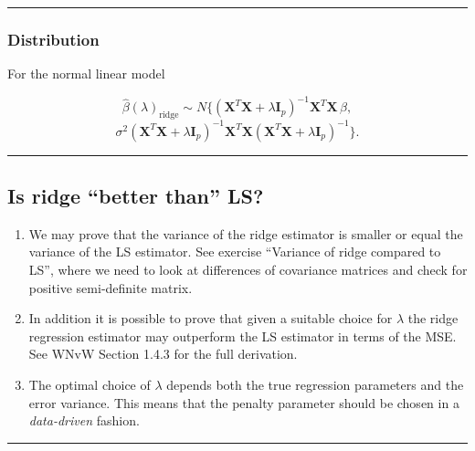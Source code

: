 \documentclass[
  letterpaper,
  DIV=11,
  numbers=noendperiod]{scrartcl}
\begin{document}
\begin{center}\rule{0.5\linewidth}{0.5pt}\end{center}

\hypertarget{distribution}{%
\subsubsection{Distribution}\label{distribution}}

For the normal linear model

\[\hat{\beta}(\lambda)_{\text{ridge}} \sim N \{ (\mathbf{X}^T \mathbf{X} + \lambda \mathbf{I}_{p})^{-1} \mathbf{X}^T \mathbf{X} \, \beta,\]
\[\sigma^2 ( \mathbf{X}^T \mathbf{X} + \lambda \mathbf{I}_{p} )^{-1}  \mathbf{X}^T \mathbf{X} ( \mathbf{X}^T \mathbf{X} + \lambda \mathbf{I}_{p} )^{-1}  \}.\]

\begin{center}\rule{0.5\linewidth}{0.5pt}\end{center}

\hypertarget{is-ridge-better-than-ls}{%
\subsection{Is ridge ``better than''
LS?}\label{is-ridge-better-than-ls}}

\begin{enumerate}
\def\labelenumi{\arabic{enumi})}
\item
  We may prove that the variance of the ridge estimator is smaller or
  equal the variance of the LS estimator. See exercise ``Variance of
  ridge compared to LS'', where we need to look at differences of
  covariance matrices and check for positive semi-definite matrix.
\item
  In addition it is possible to prove that given a suitable choice for
  \(\lambda\) the ridge regression estimator may outperform the LS
  estimator in terms of the MSE. See WNvW Section 1.4.3 for the full
  derivation.
\item
  The optimal choice of \(\lambda\) depends both the true regression
  parameters and the error variance. This means that the penalty
  parameter should be chosen in a \emph{data-driven} fashion.
\end{enumerate}

\begin{center}\rule{0.5\linewidth}{0.5pt}\end{center}
\end{document}
